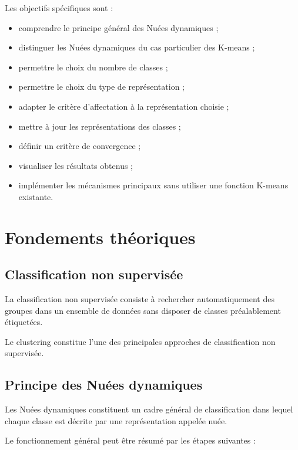 \documentclass[12pt,a4paper]{report}
\begin{document}
Les objectifs spécifiques sont :

\begin{itemize}
    \item comprendre le principe général des Nuées dynamiques ;
    \item distinguer les Nuées dynamiques du cas particulier des
    K-means ;
    \item permettre le choix du nombre de classes ;
    \item permettre le choix du type de représentation ;
    \item adapter le critère d'affectation à la représentation choisie ;
    \item mettre à jour les représentations des classes ;
    \item définir un critère de convergence ;
    \item visualiser les résultats obtenus ;
    \item implémenter les mécanismes principaux sans utiliser
    une fonction K-means existante.
\end{itemize}


\chapter{Fondements théoriques}

\section{Classification non supervisée}

La classification non supervisée consiste à rechercher automatiquement
des groupes dans un ensemble de données sans disposer de classes
préalablement étiquetées.

Le clustering constitue l'une des principales approches de classification
non supervisée.

\section{Principe des Nuées dynamiques}

Les Nuées dynamiques constituent un cadre général de classification
dans lequel chaque classe est décrite par une représentation appelée
nuée.

Le fonctionnement général peut être résumé par les étapes suivantes :
\end{document}
